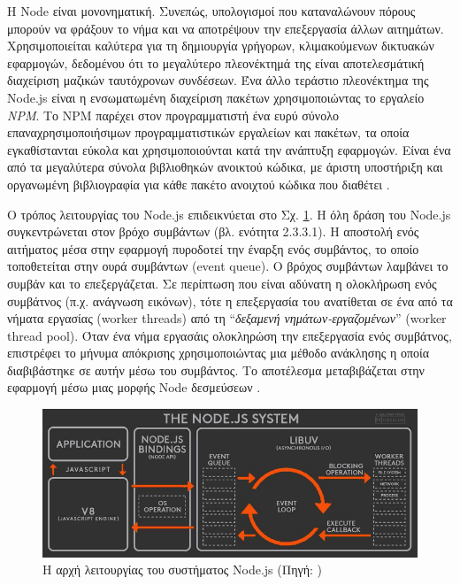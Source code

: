 Η Node είναι μονονηματική. Συνεπώς, υπολογισμοί που καταναλώνουν πόρους μπορούν να φράξουν το νήμα και να αποτρέψουν την επεξεργασία άλλων αιτημάτων. Χρησιμοποιείται καλύτερα για τη δημιουργία γρήγορων, κλιμακούμενων δικτυακών εφαρμογών, δεδομένου ότι το μεγαλύτερο πλεονέκτημά της είναι αποτελεσμάτική διαχείριση μαζικών ταυτόχρονων συνδέσεων. Ένα άλλο τεράστιο πλεονέκτημα της Node.js είναι η ενσωματωμένη διαχείριση πακέτων χρησιμοποιώντας το εργαλείο \textit{NPM}. Το NPM παρέχει στον προγραμματιστή ένα ευρύ σύνολο επαναχρησιμοποιήσιμων προγραμματιστικών εργαλείων και πακέτων, τα οποία εγκαθίστανται εύκολα και χρησιμοποιούνται κατά την ανάπτυξη εφαρμογών. Είναι ένα από τα μεγαλύτερα σύνολα βιβλιοθηκών ανοικτού κώδικα, με άριστη υποστήριξη και οργανωμένη βιβλιογραφία για κάθε πακέτο ανοιχτού κώδικα που διαθέτει \cite{[NODE3]}.

Ο τρόπος λειτουργίας του Node.js επιδεικνύεται στο Σχ. \ref{nodesystem}. Η όλη δράση του Node.js συγκεντρώνεται στον βρόχο συμβάντων (βλ. ενότητα 2.3.3.1). Η αποστολή ενός αιτήματος μέσα στην εφαρμογή πυροδοτεί την έναρξη ενός συμβάντος, το οποίο τοποθετείται στην ουρά συμβάντων (event queue). Ο βρόχος συμβάντων λαμβάνει το συμβάν και το επεξεργάζεται. Σε περίπτωση που είναι αδύνατη η ολοκλήρωση ενός συμβάτνος (π.χ. ανάγνωση εικόνων), τότε η επεξεργασία του ανατίθεται σε ένα από τα νήματα εργασίας (worker threads) από τη ``\textit{δεξαμενή νημάτων-εργαζομένων}'' (worker thread pool). Όταν ένα νήμα εργασάις ολοκληρώση την επεξεργασία ενός συμβάτνος, επιστρέφει το μήνυμα απόκρισης χρησιμοποιώντας μια μέθοδο ανάκλησης η οποία διαβιβάστηκε σε αυτήν μέσω του συμβάντος. Το αποτέλεσμα μεταβιβάζεται στην εφαρμογή μέσω μιας μορφής Node δεσμεύσεων \cite{[NODE2]}. 

\begin{figure}[ht]
    \centering
    \includegraphics[scale=0.4]{figures/node-system.png}
    \caption{H αρχή λειτουργίας του συστήματος Node.js (Πηγή: \cite{[NODE4]})}
    \label{nodesystem}
\end{figure}


